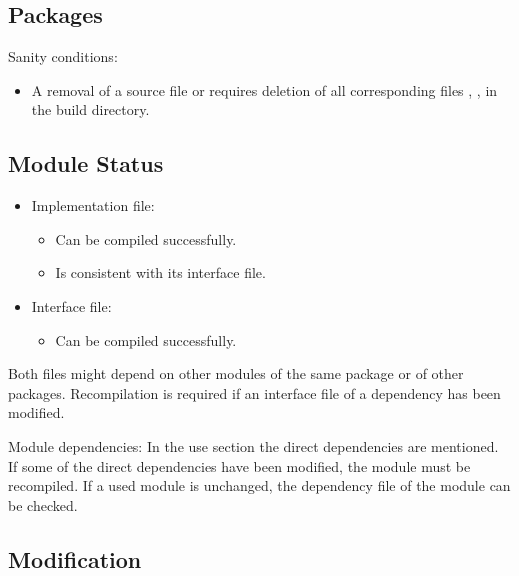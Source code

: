 \subsection{Packages}

Sanity conditions:
\begin{itemize}

\item A removal of a source file  or  requires deletion
  of all corresponding files ,  , 
  in the build directory.

\end{itemize}


\subsection{Module Status}

\begin{itemize}

\item Implementation file:

  \begin{itemize}

  \item Can be compiled successfully.

  \item Is consistent with its interface file.

  \end{itemize}

\item Interface file:

  \begin{itemize}
  \item Can be compiled successfully.
  \end{itemize}

\end{itemize}


Both files might depend on other modules of the same package or of other
packages. Recompilation is required if an interface file of a dependency has
been modified.


Module dependencies: In the use section the direct dependencies are
mentioned. If some of the direct dependencies have been modified, the module
must be recompiled. If a used module is unchanged, the dependency file of the
module can be checked.





\subsection{ Modification}


